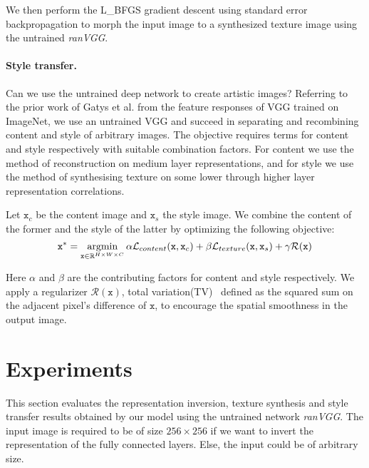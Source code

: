 \documentclass{article}
\begin{document}
We then perform the L\_BFGS gradient descent using standard error backpropagation to morph the input image to a synthesized texture image using the untrained \emph{ranVGG}.

\paragraph{Style transfer.} Can we use the untrained deep network to create artistic images? Referring to the prior work of Gatys et al.\cite{Gatys2015Style} from the feature responses of VGG trained on ImageNet, we use an untrained VGG and succeed in separating and recombining content and style of arbitrary images.
The objective requires terms for content and style respectively with suitable combination factors.
For content we use the method of reconstruction on medium layer representations, and for style we use the method of synthesising texture on some lower through higher layer representation correlations.


Let $\texttt{x}_c$ be the content image and $\texttt{x}_s$ the style image. We combine the content of the former and the style of the latter by optimizing the following objective:
\setlength{\belowdisplayskip}{2pt}
\setlength{\abovedisplayskip}{2pt}
\begin{equation}
\texttt{x}^* = \operatornamewithlimits{argmin}_{ \texttt{x} \in \mathbb{R}^{H \times W \times C} }
\alpha \mathcal{L}_{content}(\texttt{x}, \texttt{x}_c) + \beta \mathcal{L}_{texture}(\texttt{x}, \texttt{x}_s) + \gamma \mathcal{R} (\texttt{x})
\label{eq:artLoss}
\end{equation}

Here $\alpha$ and $\beta$ are the contributing factors for content and style respectively. We apply a regularizer $\mathcal{R} (\texttt{x})$, total variation(TV)~\cite{Mahendran2015CVPR} defined as the squared sum on the adjacent pixel's difference of $\texttt{x}$, to encourage the spatial smoothness in the output image.


\vspace{-0.5em}
\section{Experiments}

This section evaluates the representation inversion, texture synthesis and style transfer results obtained by our model using the untrained network \emph{ranVGG}.
The input image is required to be of size $256 \times 256$ if we want to invert the representation of the fully connected layers. Else, the input could be of arbitrary size.
\end{document}
